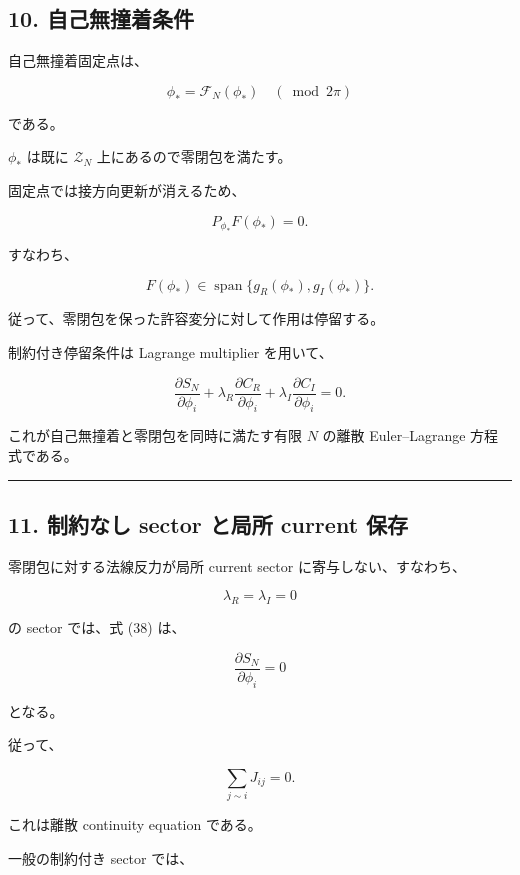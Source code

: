 \documentclass[
  a4paper,
]{ltjsarticle}
\begin{document}
\subsection{10.
自己無撞着条件}\label{ux81eaux5df1ux7121ux649eux7740ux6761ux4ef6}

自己無撞着固定点は、

\[
\boxed{
\phi_*
=
\mathcal F_N(\phi_*)
\quad
(\bmod 2\pi)
}
\tag{35}
\]

である。

\(\phi_*\) は既に \(\mathcal Z_N\) 上にあるので零閉包を満たす。

固定点では接方向更新が消えるため、

\[
\boxed{
P_{\phi_*}F(\phi_*)=0.
}
\tag{36}
\]

すなわち、

\[
F(\phi_*)
\in
\operatorname{span}
\{g_R(\phi_*),g_I(\phi_*)\}.
\tag{37}
\]

従って、零閉包を保った許容変分に対して作用は停留する。

制約付き停留条件は Lagrange multiplier を用いて、

\[
\boxed{
\frac{\partial S_N}{\partial\phi_i}
+
\lambda_R
\frac{\partial C_R}{\partial\phi_i}
+
\lambda_I
\frac{\partial C_I}{\partial\phi_i}
=
0.
}
\tag{38}
\]

これが自己無撞着と零閉包を同時に満たす有限 \(N\) の離散 Euler--Lagrange
方程式である。

\begin{center}\rule{0.5\linewidth}{0.5pt}\end{center}

\subsection{11. 制約なし sector と局所 current
保存}\label{ux5236ux7d04ux306aux3057-sector-ux3068ux5c40ux6240-current-ux4fddux5b58}

零閉包に対する法線反力が局所 current sector に寄与しない、すなわち、

\[
\lambda_R=\lambda_I=0
\]

の sector では、式 (38) は、

\[
\frac{\partial S_N}{\partial\phi_i}=0
\]

となる。

従って、

\[
\boxed{
\sum_{j\sim i}J_{ij}=0.
}
\tag{39}
\]

これは離散 continuity equation である。

一般の制約付き sector では、
\end{document}
